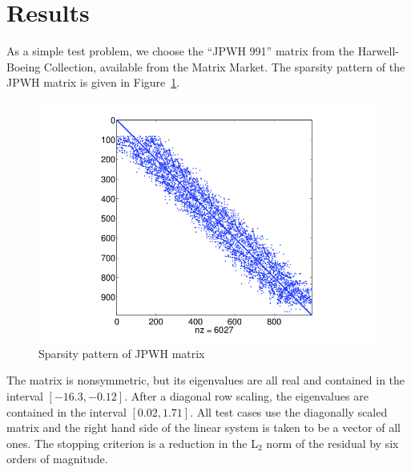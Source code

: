 \documentclass[10pt]{article}
\begin{document}
\section{Results}

As a simple test problem, we choose the ``JPWH 991'' matrix from
the Harwell-Boeing Collection, available from the Matrix Market.  
The sparsity pattern of the JPWH matrix is given in Figure~\ref{fig:jpwh_sparsity}.
\begin{figure}
\includegraphics[width=4.5in]{jpwh_sparsity}
\caption{Sparsity pattern of JPWH matrix \label{fig:jpwh_sparsity}}
\end{figure}
The matrix is nonsymmetric, but its eigenvalues are all real and
contained in the interval $[-16.3,-0.12]$.  After a diagonal row
scaling, the eigenvalues are contained in the interval $[0.02,1.71]$.
All test cases use the diagonally scaled matrix and the right
hand side of the linear system is taken to be a vector of all ones.
The stopping criterion is a reduction in the L$_2$ norm of the residual
by six orders of magnitude.
\end{document}

